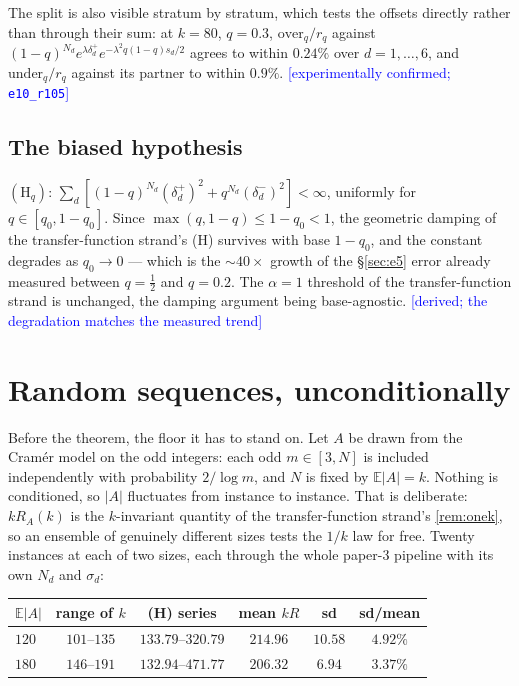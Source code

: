 \documentclass[11pt,a4paper]{article}
\theoremstyle{plain}
\theoremstyle{definition}
\theoremstyle{remark}
\newcommand{\STATUS}[1]{\textcolor{blue}{\textsf{[#1]}}}
\begin{document}
The split is also visible stratum by stratum, which tests the offsets directly rather than
through their sum: at $k=80$, $q=0.3$, $\mathrm{over}_q/r_q$ against
$(1-q)^{N_d}e^{\lambda\delta^{+}_d}e^{-\lambda^2q(1-q)s_d/2}$ agrees to within $0.24\%$ over
$d=1,\dots,6$, and $\mathrm{under}_q/r_q$ against its partner to within $0.9\%$.
\STATUS{experimentally confirmed; \texttt{e10\_r105}}

\subsection{The biased hypothesis}\label{sec:biasedH}

$(\mathrm{H}_q)$: $\sum_d[(1-q)^{N_d}(\delta^{+}_d)^2+q^{N_d}(\delta^{-}_d)^2]<\infty$,
uniformly for $q\in[q_0,1-q_0]$. Since $\max(q,1-q)\le1-q_0<1$, the geometric damping of
the transfer-function strand's (H) survives with base $1-q_0$, and the constant degrades as $q_0\to0$ --- which is
the $\sim40\times$ growth of the \S\ref{sec:e5} error already measured between $q=\tfrac12$
and $q=0.2$. The $\alpha=1$ threshold of the transfer-function strand is unchanged, the damping argument being
base-agnostic. \STATUS{derived; the degradation matches the measured trend}

\section{Random sequences, unconditionally}\label{sec:random}

Before the theorem, the floor it has to stand on. Let $A$ be drawn from the Cram\'er model on
the odd integers: each odd $m\in[3,N]$ is included independently with probability $2/\log m$,
and $N$ is fixed by $\mathbb{E}|A|=k$. Nothing is conditioned, so $|A|$ fluctuates from
instance to instance. That is deliberate: $kR_A(k)$ is the $k$-invariant quantity of the transfer-function strand's
\ref{rem:onek}, so an ensemble of genuinely different sizes tests the $1/k$ law for free.
Twenty instances at each of two sizes, each through the whole paper-3 pipeline with its own
$N_d$ and $\sigma_d$:

\begin{center}
\begin{tabular}{lccccc}
\toprule
$\mathbb{E}|A|$ & range of $k$ & (H) series & mean $kR$ & sd & sd/mean\\
\midrule
$120$ & $101$--$135$ & $133.79$--$320.79$ & $214.96$ & $10.58$ & $4.92\%$\\
$180$ & $146$--$191$ & $132.94$--$471.77$ & $206.32$ & $6.94$  & $3.37\%$\\
\bottomrule
\end{tabular}
\end{center}
\end{document}
